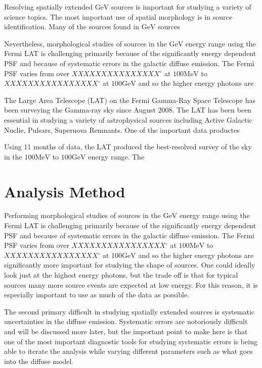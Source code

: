 \documentclass[preprint]{aastex}
\newcommand{\mev}{\text{MeV}\xspace}
\newcommand{\gev}{\text{GeV}\xspace}
\renewcommand{\deg}{\ensuremath{^\circ}\xspace}
\begin{document}
Resolving spatially extended $\gev$ sources is important for studying a
variety of science topics. The most important use of spatial morphology
is in source identification. Many of the sources found in $\gev$ sources

Nevertheless, morphological studies of sources in the $\gev$ energy range using
the Fermi LAT is challenging primarily because of the significantly energy
dependent PSF and because of systematic errors in the
galactic diffuse emission. The Fermi PSF varies from over $XXXXXXXXXXXXXXX\deg$
at $100\mev$ to $XXXXXXXXXXXXXXXX\deg$ at $100\gev$ and so the higher energy photons are

The Large Area Telescope (LAT) on the Fermi Gamma-Ray Space Telescope
has been surveying the Gamma-ray sky since August 2008. The LAT has been
been essential in studying a variety of astrophysical sources including
Active Galactic Nuclie, Pulsars, Supernova Remnants. 
One of the important data productes 

Using 11 months of data, the LAT produced the best-resolved survey of the sky
in the $100\mev$ to $100\gev$ energy range\cite{2FGL Paper}. The


\section{Analysis Method}


%

Performing morphological studies of sources in the $\gev$ energy range using
the Fermi LAT is challenging primarily because of the significantly energy
dependent PSF and because of systematic errors in the
galactic diffuse emission. The Fermi PSF varies from over $XXXXXXXXXXXXXXXX\deg$
at $100\mev$ to $XXXXXXXXXXXXXXXX\deg$ at $100\gev$ and so the higher energy photons are
significantly more important for studying the shape of sources. One could
ideally look just at the highest energy photons, but the trade off is that
for typical sources many more source events are expected at low energy.
For this reason, it is especially important to use as much of the data
as possible.

The second primary difficult in studying spatially extended sources is
systematic uncertainties in the diffuse emission. Systematic errors are
notoriously difficult and will be discussed more later, but the important
point to make here is that one of the most important diagnostic tools for
studying systematic errors is being able to iterate the analysis while
varying different parameters such as what goes into the diffuse model.
\end{document}
